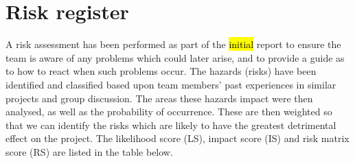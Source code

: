 \section{Risk register}
\label{sec:riskregister}

A risk assessment has been performed as part of the \hl{initial}
report to ensure the team is aware of any problems which could later
arise, and to provide a guide as to how to react when such problems
occur. The hazards (risks) have been identified and classified based
upon team members' past experiences in similar projects and group
discussion. The areas these hazards impact were then analysed, as well
as the probability of occurrence. These are then weighted so that we
can identify the risks which are likely to have the greatest
detrimental effect on the project. The likelihood score (LS), impact
score (IS) and risk matrix score (RS) are listed in the table below.

